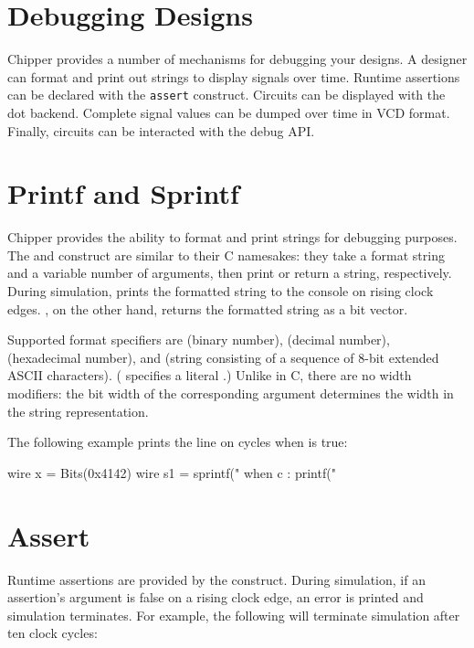\section{Debugging Designs}

Chipper provides a number of mechanisms for debugging your designs.  
A designer can format and print out strings to display signals over time.
Runtime assertions can be declared with the \verb+assert+ construct.
Circuits can be displayed with the dot backend.
Complete signal values can be dumped over time in VCD format.
Finally, circuits can be interacted with the debug API.

\section{Printf and Sprintf}

Chipper provides the ability to format and print strings for debugging
purposes.  The  and  construct are similar to their
C namesakes: they take a format string and a variable number of arguments,
then print or return a string, respectively.  During simulation, 
prints the formatted string to the console on rising clock edges.
, on the other hand, returns the formatted string as a bit
vector.

Supported format specifiers are  (binary number), 
(decimal number),  (hexadecimal number), and  (string
consisting of a sequence of 8-bit extended ASCII characters).  (\code{\%\%}
specifies a literal \code{\%}.) Unlike in C, there are no width modifiers: the
bit width of the corresponding argument determines the width in the string
representation.

The following example prints the line  on cycles when
 is true:

\begin{stanza}
wire x = Bits(0x4142)
wire s1 = sprintf("%
when c : printf("%
\end{stanza}

\section{Assert}

Runtime assertions are provided by the  construct.  During
simulation, if an assertion's argument is false on a rising clock edge,
an error is printed and simulation terminates.  For example, the following
will terminate simulation after ten clock cycles:

